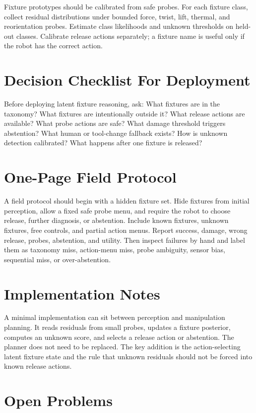 \documentclass{article}
\begin{document}
Fixture prototypes should be calibrated from safe probes. For each fixture
class, collect residual distributions under bounded force, twist, lift,
thermal, and reorientation probes. Estimate class likelihoods and unknown
thresholds on held-out classes. Calibrate release actions separately; a
fixture name is useful only if the robot has the correct action.

\section{Decision Checklist For Deployment}

Before deploying latent fixture reasoning, ask: What fixtures are in the
taxonomy? What fixtures are intentionally outside it? What release actions are
available? What probe actions are safe? What damage threshold triggers
abstention? What human or tool-change fallback exists? How is unknown
detection calibrated? What happens after one fixture is released?

\section{One-Page Field Protocol}

A field protocol should begin with a hidden fixture set. Hide fixtures from
initial perception, allow a fixed safe probe menu, and require the robot to
choose release, further diagnosis, or abstention. Include known fixtures,
unknown fixtures, free controls, and partial action menus. Report success,
damage, wrong release, probes, abstention, and utility. Then inspect failures
by hand and label them as taxonomy miss, action-menu miss, probe ambiguity,
sensor bias, sequential miss, or over-abstention.

\section{Implementation Notes}

A minimal implementation can sit between perception and manipulation planning.
It reads residuals from small probes, updates a fixture posterior, computes an
unknown score, and selects a release action or abstention. The planner does not
need to be replaced. The key addition is the action-selecting latent fixture
state and the rule that unknown residuals should not be forced into known
release actions.

\section{Open Problems}
\end{document}

